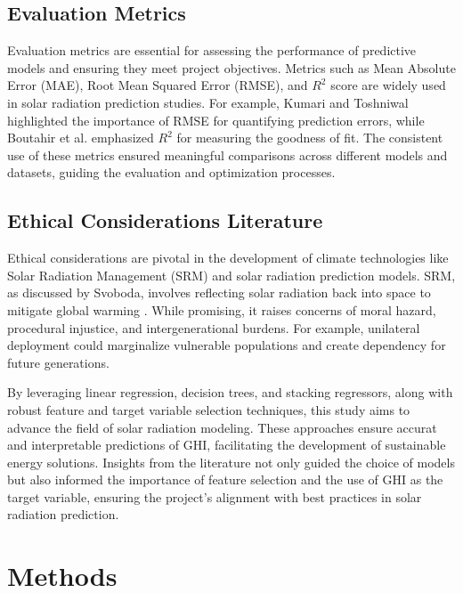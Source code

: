 \documentclass[10pt,twocolumn]{article}
\begin{document}
\begin{itemize}
\subsection{Evaluation Metrics}
Evaluation metrics are essential for assessing the performance of predictive models and ensuring they meet project objectives. Metrics such as Mean Absolute Error (MAE), Root Mean Squared Error (RMSE), and \( R^2 \) score are widely used in solar radiation prediction studies. For example, Kumari and Toshniwal \cite{14} highlighted the importance of RMSE for quantifying prediction errors, while Boutahir et al. \cite{Boutahir2022} emphasized \( R^2 \) for measuring the goodness of fit. The consistent use of these metrics ensured meaningful comparisons across different models and datasets, guiding the evaluation and optimization processes.
\subsection{Ethical Considerations Literature}

Ethical considerations are pivotal in the development of climate technologies like Solar Radiation Management (SRM) and solar radiation prediction models. SRM, as discussed by Svoboda, involves reflecting solar radiation back into space to mitigate global warming \cite{11}. While promising, it raises concerns of moral hazard, procedural injustice, and intergenerational burdens. For example, unilateral deployment could marginalize vulnerable populations and create dependency for future generations.




By leveraging linear regression, decision trees, and stacking regressors, along with robust feature and target variable selection techniques, this study aims to advance the field of solar radiation modeling. These approaches ensure accurat and interpretable  predictions of GHI, facilitating the development of sustainable energy solutions. Insights from the literature not only guided the choice of models but also informed the importance of feature selection and the use of GHI as the target variable, ensuring the project's alignment with best practices in solar radiation prediction.






\section{Methods}


\end{itemize}
\end{document}
